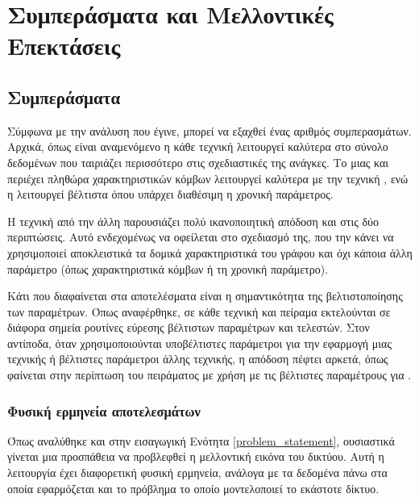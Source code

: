 \chapter{Συμπεράσματα και Μελλοντικές Επεκτάσεις}

\section{Συμπεράσματα}

Σύμφωνα με την ανάλυση που έγινε, μπορεί να εξαχθεί ένας αριθμός συμπερασμάτων. Αρχικά, όπως είναι 
αναμενόμενο η κάθε τεχνική λειτουργεί καλύτερα στο σύνολο δεδομένων που ταιριάζει περισσότερο στις
σχεδιαστικές της ανάγκες. Το  μιας και περιέχει πληθώρα χαρακτηριστικών κόμβων λειτουργεί
καλύτερα με την τεχνική , ενώ η  λειτουργεί βέλτιστα όπου υπάρχει διαθέσιμη η 
χρονική παράμετρος.

Η τεχνική  από την άλλη παρουσιάζει πολύ ικανοποιητική απόδοση και στις δύο περιπτώσεις.
Αυτό ενδεχομένως να οφείλεται στο σχεδιασμό της, που την κάνει να χρησιμοποιεί αποκλειστικά τα δομικά
χαρακτηριστικά του γράφου και όχι κάποια άλλη παράμετρο (όπως χαρακτηριστικά κόμβων ή τη χρονική 
παράμετρο).

Κάτι που διαφαίνεται στα αποτελέσματα είναι η σημαντικότητα της βελτιστοποίησης των παραμέτρων. Όπως
αναφέρθηκε, σε κάθε τεχνική και πείραμα εκτελούνται σε διάφορα σημεία ρουτίνες εύρεσης βέλτιστων
παραμέτρων και τελεστών. Στον αντίποδα, όταν χρησιμοποιούνται υποβέλτιστες παράμετροι για την 
εφαρμογή μιας τεχνικής ή βέλτιστες παράμετροι άλλης τεχνικής, η απόδοση πέφτει αρκετά, όπως φαίνεται 
στην περίπτωση του πειράματος με χρήση  με τις βέλτιστες παραμέτρους για .

\subsection{Φυσική ερμηνεία αποτελεσμάτων}

Όπως αναλύθηκε και στην εισαγωγική Ενότητα \ref{problem_statement}, ουσιαστικά γίνεται μια προσπάθεια
να προβλεφθεί η μελλοντική εικόνα του δικτύου. Αυτή η λειτουργία έχει διαφορετική φυσική ερμηνεία,
ανάλογα με τα δεδομένα πάνω στα οποία εφαρμόζεται και το πρόβλημα το οποίο μοντελοποιεί το εκάστοτε 
δίκτυο.

